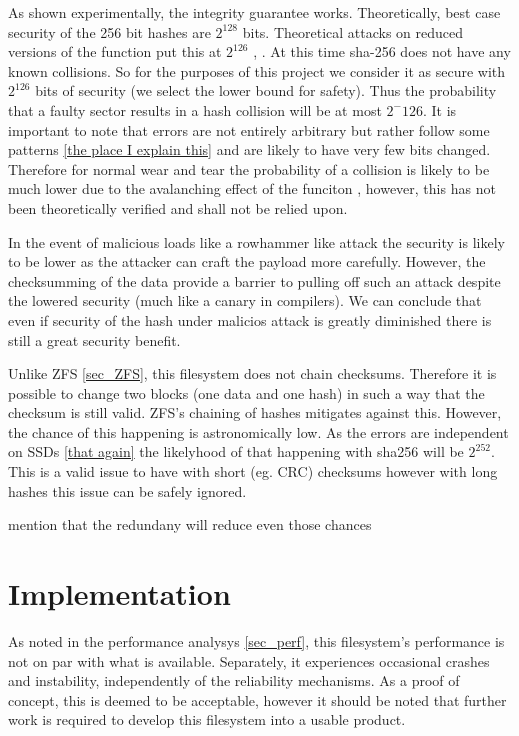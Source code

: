         As shown experimentally, the integrity guarantee works. Theoretically,
        best case security of the 256 bit hashes are $2^128$ bits. Theoretical
        attacks on reduced versions of the function put this at $2^126$
        \cite{sha2_security}, \cite{https://eprint.iacr.org/2016/374.pdf}. At
        this time sha-256 does not have any known collisions. So for the
        purposes of this project we consider it as secure with $2^126$ bits of
        security (we select the lower bound for safety).  Thus the probability
        that a faulty sector results in a hash collision will be at most
        $2^-126$. It is important to note that errors are not entirely
        arbitrary but rather follow some patterns \ref{the place I explain
        this} and are likely to have very few bits changed. Therefore for
        normal wear and tear the probability of a collision is likely to be
        much lower due to the avalanching effect of the funciton \cite{one of
        the above?}, however, this has not been theoretically verified and
        shall not be relied upon.

        In the event of malicious loads like a rowhammer like attack
        \cite{https://www.usenix.org/system/files/conference/woot17/woot17-paper-kurmus.pdf}
        the security is likely to be lower as the attacker can craft the
        payload more carefully. However, the checksumming of the data provide a
        barrier to pulling off such an attack despite the lowered security
        (much like a canary in compilers). We can conclude that even if
        security of the hash under malicios attack is greatly diminished there
        is still a great security benefit.

        Unlike ZFS \ref{sec_ZFS}, this filesystem does not chain checksums.
        Therefore it is possible to change two blocks (one data and one hash)
        in such a way that the checksum is still valid. ZFS's chaining of
        hashes mitigates against this. However, the chance of this happening is
        astronomically low. As the errors are independent on SSDs \ref{that
        again} the likelyhood of that happening with sha256 will be $2^252$.
        This is a valid issue to have with short (eg. CRC) checksums however
        with long hashes this issue can be safely ignored.

        mention that the redundany will reduce even those chances

    \section{Implementation}

        As noted in the performance analysys \ref{sec_perf}, this filesystem's
        performance is not on par with what is available.  Separately, it
        experiences occasional crashes and instability, independently of the
        reliability mechanisms. As a proof of concept, this is deemed to be
        acceptable, however it should be noted that further work is required to
        develop this filesystem into a usable product.
